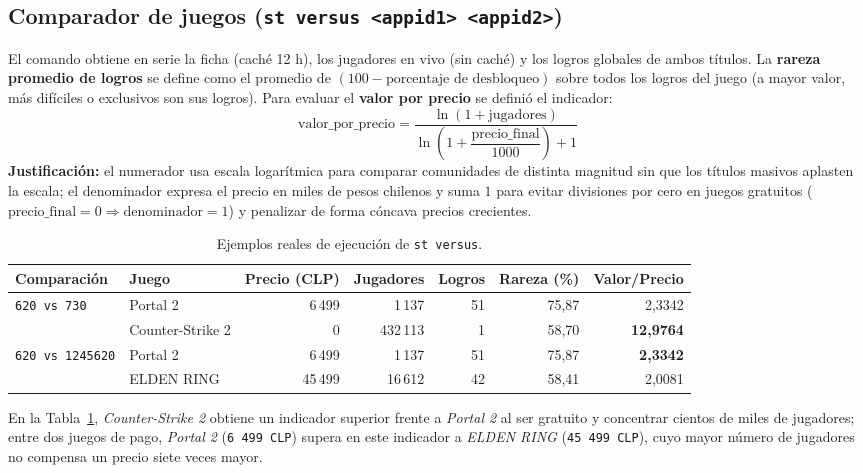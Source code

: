 \documentclass[11pt,a4paper]{article}
\begin{document}
\subsection{Comparador de juegos (\texttt{st versus <appid1> <appid2>})}

El comando obtiene en serie la ficha (caché 12 h), los jugadores en vivo (sin caché) y los logros globales de ambos títulos. La \textbf{rareza promedio de logros} se define como el promedio de $(100 - \text{porcentaje de desbloqueo})$ sobre todos los logros del juego (a mayor valor, más difíciles o exclusivos son sus logros). Para evaluar el \textbf{valor por precio} se definió el indicador:
\[
    \text{valor\_por\_precio} = \frac{\ln(1 + \text{jugadores})}{\ln\!\left(1 + \dfrac{\text{precio\_final}}{1000}\right) + 1}
\]
\textbf{Justificación:} el numerador usa escala logarítmica para comparar comunidades de distinta magnitud sin que los títulos masivos aplasten la escala; el denominador expresa el precio en miles de pesos chilenos y suma $1$ para evitar divisiones por cero en juegos gratuitos ($\text{precio\_final} = 0 \Rightarrow \text{denominador} = 1$) y penalizar de forma cóncava precios crecientes.

\begin{table}[H]
\centering
\caption{Ejemplos reales de ejecución de \texttt{st versus}.}
\label{tab:versus}
\small
\begin{tabular}{@{}llrrrrr@{}}
\toprule
\textbf{Comparación} & \textbf{Juego} & \textbf{Precio (CLP)} & \textbf{Jugadores} & \textbf{Logros} & \textbf{Rareza (\%)} & \textbf{Valor/Precio} \\
\midrule
\texttt{620 vs 730} & Portal 2 & 6\,499 & 1\,137 & 51 & 75{,}87 & 2{,}3342 \\
                    & Counter-Strike 2 & 0 & 432\,113 & 1 & 58{,}70 & \textbf{12{,}9764} \\
\midrule
\texttt{620 vs 1245620} & Portal 2 & 6\,499 & 1\,137 & 51 & 75{,}87 & \textbf{2{,}3342} \\
                        & ELDEN RING & 45\,499 & 16\,612 & 42 & 58{,}41 & 2{,}0081 \\
\bottomrule
\end{tabular}
\end{table}

En la Tabla~\ref{tab:versus}, \emph{Counter-Strike 2} obtiene un indicador superior frente a \emph{Portal 2} al ser gratuito y concentrar cientos de miles de jugadores; entre dos juegos de pago, \emph{Portal 2} (\texttt{6\,499 CLP}) supera en este indicador a \emph{ELDEN RING} (\texttt{45\,499 CLP}), cuyo mayor número de jugadores no compensa un precio siete veces mayor.
\end{document}
